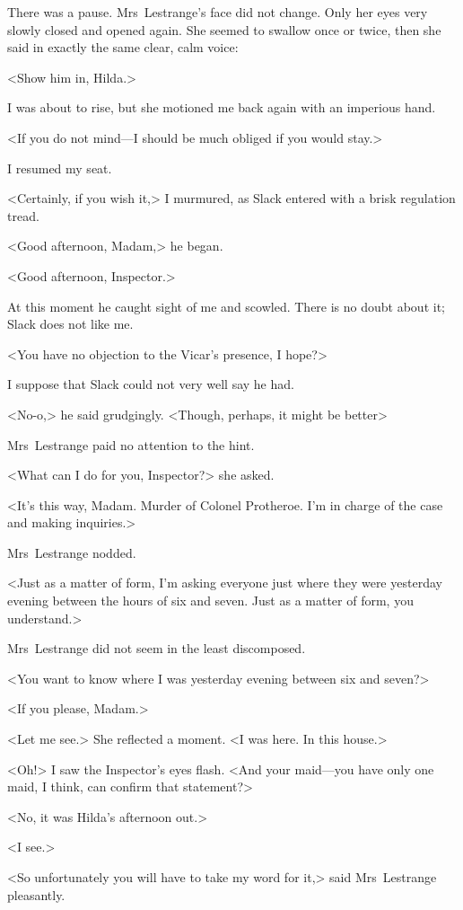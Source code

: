 There was a pause. Mrs~Lestrange's face did not change. Only her eyes very slowly closed and opened again. She seemed to swallow once or twice, then she said in exactly the same clear, calm voice:

<Show him in, Hilda.>

I was about to rise, but she motioned me back again with an imperious hand.

<If you do not mind—I should be much obliged if you would stay.>

I resumed my seat.

<Certainly, if you wish it,> I murmured, as Slack entered with a brisk regulation tread.

<Good afternoon, Madam,> he began.

<Good afternoon, Inspector.>

At this moment he caught sight of me and scowled. There is no doubt about it; Slack does not like me.

<You have no objection to the Vicar's presence, I hope?>

I suppose that Slack could not very well say he had.

<No-o,> he said grudgingly. <Though, perhaps, it might be better\longdash>

Mrs~Lestrange paid no attention to the hint.

<What can I do for you, Inspector?> she asked.

<It's this way, Madam. Murder of Colonel Protheroe. I'm in charge of the case and making inquiries.>

Mrs~Lestrange nodded.

<Just as a matter of form, I'm asking everyone just where they were yesterday evening between the hours of six and seven. Just as a matter of form, you understand.>

Mrs~Lestrange did not seem in the least discomposed.

<You want to know where I was yesterday evening between six and seven?>

<If you please, Madam.>

<Let me see.> She reflected a moment. <I was here. In this house.>

<Oh!> I saw the Inspector's eyes flash. <And your maid—you have only one maid, I think, can confirm that statement?>

<No, it was Hilda's afternoon out.>

<I see.>

<So unfortunately you will have to take my word for it,> said Mrs~Lestrange pleasantly.

